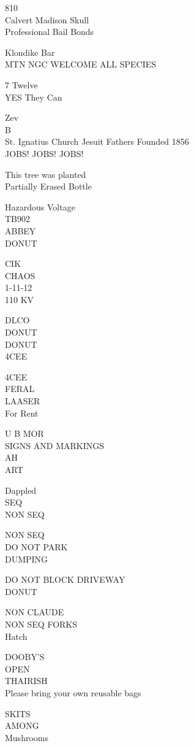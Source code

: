 \documentclass[10pt,letterpaper]{article}
\begin{document}
810\\
Calvert Madison Skull\\
Professional Bail Bonds

Klondike Bar\\
MTN NGC WELCOME ALL SPECIES

7 Twelve\\
YES They Can

Zev\\
B\\
St. Ignatius Church Jesuit Fathers Founded 1856\\
JOBS! JOBS! JOBS!

This tree was planted\\
Partially Erased Bottle

Hazardous Voltage\\
TB902\\
ABBEY\\
DONUT

CIK\\
CHAOS\\
1{-}11{-}12\\
110 KV

DLCO\\
DONUT\\
DONUT\\
4CEE

4CEE\\
FERAL\\
LAASER\\
For Rent

U B MOR\\
SIGNS AND MARKINGS\\
AH\\
ART

Dappled\\
SEQ\\
NON SEQ

NON SEQ\\
DO NOT PARK\\
DUMPING

DO NOT BLOCK DRIVEWAY\\
DONUT

NON CLAUDE\\
NON SEQ FORKS\\
Hatch

DOOBY'S\\
OPEN\\
THAIRISH\\
Please bring your own reusable bags

SKITS\\
AMONG\\
Mushrooms
\end{document}
